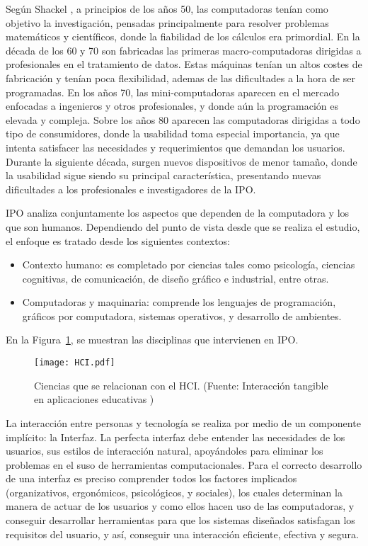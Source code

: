 Según Shackel \cite{Shackel}, a principios de los años 50, las computadoras tenían como objetivo la investigación, pensadas principalmente para resolver problemas matemáticos y científicos, donde la fiabilidad de los cálculos era primordial. En la década de los 60 y 70 son fabricadas las primeras macro-computadoras dirigidas a profesionales en el tratamiento de datos. Estas máquinas tenían un altos costes de fabricación y tenían poca flexibilidad, ademas de las dificultades a la hora de ser programadas. En los años 70, las mini-computadoras aparecen en el mercado enfocadas a ingenieros y otros profesionales, y donde aún la programación es elevada y compleja. Sobre los años 80 aparecen las computadoras dirigidas a todo tipo de consumidores, donde la usabilidad toma especial importancia, ya que intenta satisfacer las necesidades y requerimientos que demandan los usuarios. Durante la siguiente década, surgen nuevos dispositivos de menor tamaño, donde la usabilidad sigue siendo su principal característica, presentando nuevas dificultades a los profesionales e investigadores de la IPO.

IPO analiza conjuntamente los aspectos que dependen de la computadora y los que son humanos. Dependiendo del punto de vista desde que se realiza el estudio, el enfoque es tratado desde los siguientes contextos:
\begin{itemize}
\item Contexto humano: es completado por ciencias tales como psicología, ciencias cognitivas, de comunicación, de diseño gráfico e industrial, entre otras.
\item Computadoras y maquinaria: comprende los lenguajes de programación, gráficos por computadora, sistemas operativos, y desarrollo de ambientes.
\end{itemize}

En la Figura~\ref{fig:HCI}, se muestran las disciplinas que intervienen en IPO.

\begin{figure}[!h]
\begin{center}
\texttt{[image: HCI.pdf]}
\caption{Ciencias que se relacionan con el HCI. (Fuente: Interacción tangible en aplicaciones educativas \cite{Artola})}
\label{fig:HCI}
\end{center}
\end{figure}

La interacción entre personas y tecnología se realiza por medio de un componente implícito: la Interfaz.
La perfecta interfaz debe entender las necesidades de los usuarios, sus estilos de interacción natural, apoyándoles para eliminar los problemas en el suso de herramientas computacionales. Para el correcto desarrollo de una interfaz es preciso comprender todos los factores implicados (organizativos, ergonómicos, psicológicos, y sociales), los cuales determinan la manera de actuar de los usuarios y como ellos hacen uso de las computadoras, y conseguir desarrollar herramientas para que los sistemas diseñados satisfagan los requisitos del usuario, y así, conseguir una interacción eficiente, efectiva y segura.


